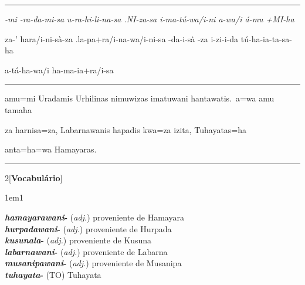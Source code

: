 \vspace{10pt}
\hrule
\vspace{10pt}


\setcounter{parcount}{0}
\begin{parnumbersa}[]
	\raggedright%
	\itshape%
	-mi
	-ra-da-mi-sa
	u-ra-hi-li-na-sa
	.NI-za-sa
	i-ma-tú-wa/i-ni
	a-wa/i
	á-mu
	+MI-ha

	za-'
	hara/i-ni-sà-za
	.la-pa+ra/i-na-wa/i-ni-sa
	-da-i-sà
	-za
	i-zi-i-da
	tú-ha-ia-ta-sa-ha

	a-tá-ha-wa/i ha-ma-ia+ra/i-sa



\end{parnumbersa}

\vspace{10pt}
\hrule
\vspace{10pt}


\setcounter{parcount}{0}
\begin{parnumbersa}[]
	\raggedright%
	\itshape%

	amu=mi Uradamis Urhilinas nimuwizas imatuwani hantawatis.\ a=wa amu tamaha

	za harnisa=za, Labarnawanis hapadis kwa=za izita,
	Tuhayatas=ha

	anta=ha=wa Hamayaras.


\end{parnumbersa}

\vspace{10pt}
\hrule
\vspace{20pt}



\begin{multicols}{2}[\noindent\textbf{Vocabulário}]
	\begin{hangparas}{1em}{1}
		\raggedright%
		\textbf{\emph{hamayarawani}-} (\emph{adj.}) \tabto{1em} proveniente de Hamayara\\
		\textbf{\emph{hurpadawani}-} (\emph{adj.}) \tabto{1em} proveniente de Hurpada\\
		\textbf{\emph{kusunala}-} (\emph{adj.}) \tabto{1em} proveniente de Kusuna\\
		\textbf{\emph{labarnawani}-} (\emph{adj.}) \tabto{1em} proveniente de Labarna\\
		\textbf{\emph{musanipawani}-} (\emph{adj.}) \tabto{1em} proveniente de Musanipa\\
		\textbf{\emph{tuhayata}-} (TO) \tabto{1em} Tuhayata\\
	\end{hangparas}
\end{multicols}

\vfill
